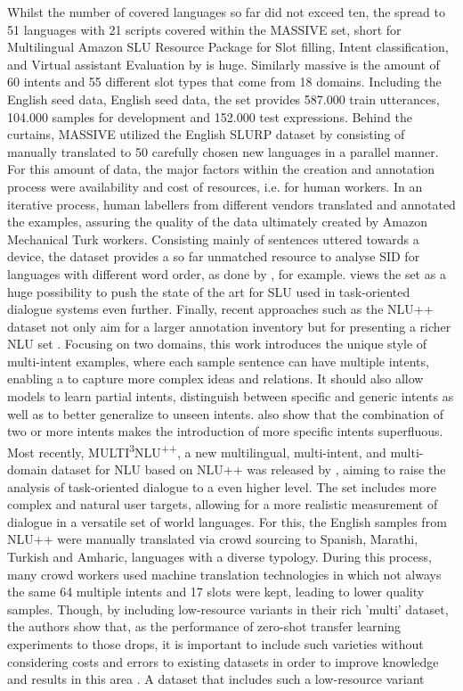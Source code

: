 \documentclass[11pt,a4paper,twoside,openright]{scrbook}
\begin{document}
Whilst the number of covered languages so far did not exceed ten, the spread to 51 languages with 21 scripts covered within the MASSIVE set, short for Multilingual Amazon SLU Resource Package for Slot filling, Intent classification, and Virtual assistant Evaluation by \citet{fitzgerald-etal-2023-massive} is huge. Similarly massive is the amount of 60 intents and 55 different slot types that come from 18 domains. Including the English seed data, English seed data, the set provides 587.000 train utterances, 104.000 samples for development and 152.000 test expressions. Behind the curtains, MASSIVE utilized the English SLURP dataset by \citet{bastianelli-2020-slurp} consisting of manually translated to 50 carefully chosen new languages in a parallel manner. For this amount of data, the major factors within the creation and annotation process were availability and cost of resources, i.e. for human workers. In an iterative process, human labellers from different vendors translated and annotated the examples, assuring the quality of the data ultimately created by Amazon Mechanical Turk workers. Consisting mainly of sentences uttered towards a device, the dataset provides a so far unmatched resource to analyse SID for languages with different word order, as done by \citet{jhan-etal-2022-c5l7}, for example. \citet{razumovskaia-etal-2022-natural} views the set as a huge possibility to push the state of the art for SLU used in task-oriented dialogue systems even further. Finally, recent approaches such as the NLU++ dataset not only aim for a larger annotation inventory but for presenting a richer NLU set \citep{casanueva-etal-2022-nlu}. Focusing on two domains, this work introduces the unique style of multi-intent examples, where each sample sentence can have multiple intents, enabling a to capture more complex ideas and relations. It should also allow models to learn partial intents, distinguish between specific and generic intents as well as to better generalize to unseen intents. \citet{larson2022survey} also show that the combination of two or more intents makes the introduction of more specific intents superfluous. Most recently, MULTI\textsuperscript{3}NLU\textsuperscript{++}, a new multilingual, multi-intent, and multi-domain dataset for NLU based on NLU++ was released by \citet{moghe-etal-2023-multi3nlu}, aiming to raise the analysis of task-oriented dialogue to a even higher level. The set includes more complex and natural user targets, allowing for a more realistic measurement of dialogue in a versatile set of world languages. For this, the English samples from NLU++ were manually translated via crowd sourcing to Spanish, Marathi, Turkish and Amharic, languages with a diverse typology. During this process, many crowd workers used machine translation technologies in which not always the same 64 multiple intents and 17 slots were kept, leading to lower quality samples. Though, by including low-resource variants in their rich 'multi' dataset, the authors show that, as the performance of zero-shot transfer learning experiments to those drops, it is important to include such varieties without considering costs and errors to existing datasets in order to improve knowledge and results in this area \citep{moghe-etal-2023-multi3nlu}. A dataset that includes such a low-resource variant 
\end{document}

